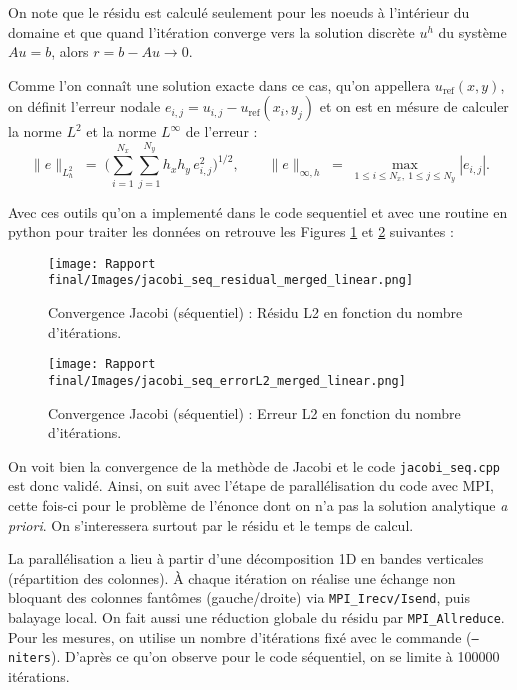 \documentclass{article}
\begin{document}
On note que le résidu est calculé seulement pour les noeuds à l'intérieur du domaine et que quand l’itération converge vers la solution discrète $u^h$ du système $A u=b$, alors $r=b-Au\to 0$.

Comme l’on connaît une solution exacte dans ce cas, qu'on appellera $u_{\mathrm{ref}}(x,y)$,
on définit l’erreur nodale $e_{i,j}=u_{i,j}-u_{\mathrm{ref}}(x_i,y_j)$ et on est en mésure de calculer la norme $L^2$ et la norme $L^{\infty}$ de l'erreur :
\[
\|e\|_{L^2_h}
\;=\;
\Bigg( \sum_{i=1}^{N_x}\sum_{j=1}^{N_y} h_x h_y\, e_{i,j}^2 \Bigg)^{1/2},
\qquad
\|e\|_{\infty,h}
\;=\;
\max_{1\le i\le N_x,\ 1\le j\le N_y} |e_{i,j}|.
\]

Avec ces outils qu'on a implementé dans le code sequentiel et avec une routine en python pour traiter les données on retrouve les Figures \ref{fig:jacobi_res} et \ref{fig:jacobi_err} suivantes :
\begin{figure}[h]
  \centering
  \texttt{[image: Rapport final/Images/jacobi\_seq\_residual\_merged\_linear.png]}
  \caption{Convergence Jacobi (séquentiel) : Résidu L2 en fonction du nombre d'itérations.}
  \label{fig:jacobi_res}
\end{figure}
\begin{figure}[h]
  \centering
  \texttt{[image: Rapport final/Images/jacobi\_seq\_errorL2\_merged\_linear.png]} %
  \caption{Convergence Jacobi (séquentiel) : Erreur L2 en fonction du nombre d'itérations.}
  \label{fig:jacobi_err}
\end{figure}

On voit bien la convergence de la methòde de Jacobi et le code \texttt{jacobi\_seq.cpp} est donc validé. Ainsi, on suit avec l'étape de parallélisation du code avec MPI, cette fois-ci pour le problème de l'énonce dont on n'a pas la solution analytique \textit{a priori}. On s'interessera surtout par le résidu et le temps de calcul.

La parallélisation a lieu à partir d'une décomposition 1D en bandes verticales (répartition des colonnes). À chaque itération on réalise une échange non bloquant des colonnes fantômes (gauche/droite) via \texttt{MPI\_Irecv/Isend}, puis balayage local. On fait aussi une réduction globale du résidu par \texttt{MPI\_Allreduce}. Pour les mesures, on utilise un nombre d’itérations fixé avec le commande (\texttt{--niters}). D'après ce qu'on observe pour le code séquentiel, on se limite à 100000 itérations.
\end{document}
